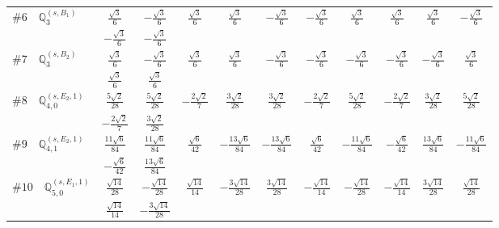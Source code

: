 \documentclass[fleqn,9pt,landscape]{jsarticle}
\begin{document}
\begin{center}
\begin{longtable}{lcccccccccc}
$ \#6\quad \mathbb{Q}_{3}^{(s,B_{1})} $ & $ \frac{\sqrt{3}}{6} $ & $ - \frac{\sqrt{3}}{6} $ & $ \frac{\sqrt{3}}{6} $ & $ \frac{\sqrt{3}}{6} $ & $ - \frac{\sqrt{3}}{6} $ & $ - \frac{\sqrt{3}}{6} $ & $ \frac{\sqrt{3}}{6} $ & $ \frac{\sqrt{3}}{6} $ & $ \frac{\sqrt{3}}{6} $ & $ - \frac{\sqrt{3}}{6} $ \\
& $ - \frac{\sqrt{3}}{6} $ & $ - \frac{\sqrt{3}}{6} $ & $  $ & $  $ & $  $ & $  $ & $  $ & $  $ & $  $ & $  $ \\ \hline
$ \#7\quad \mathbb{Q}_{3}^{(s,B_{2})} $ & $ \frac{\sqrt{3}}{6} $ & $ - \frac{\sqrt{3}}{6} $ & $ \frac{\sqrt{3}}{6} $ & $ \frac{\sqrt{3}}{6} $ & $ - \frac{\sqrt{3}}{6} $ & $ - \frac{\sqrt{3}}{6} $ & $ - \frac{\sqrt{3}}{6} $ & $ - \frac{\sqrt{3}}{6} $ & $ - \frac{\sqrt{3}}{6} $ & $ \frac{\sqrt{3}}{6} $ \\
& $ \frac{\sqrt{3}}{6} $ & $ \frac{\sqrt{3}}{6} $ & $  $ & $  $ & $  $ & $  $ & $  $ & $  $ & $  $ & $  $ \\ \hline
$ \#8\quad \mathbb{Q}_{4,0}^{(s,E_{2},1)} $ & $ \frac{5 \sqrt{2}}{28} $ & $ \frac{5 \sqrt{2}}{28} $ & $ - \frac{2 \sqrt{2}}{7} $ & $ \frac{3 \sqrt{2}}{28} $ & $ \frac{3 \sqrt{2}}{28} $ & $ - \frac{2 \sqrt{2}}{7} $ & $ \frac{5 \sqrt{2}}{28} $ & $ - \frac{2 \sqrt{2}}{7} $ & $ \frac{3 \sqrt{2}}{28} $ & $ \frac{5 \sqrt{2}}{28} $ \\
& $ - \frac{2 \sqrt{2}}{7} $ & $ \frac{3 \sqrt{2}}{28} $ & $  $ & $  $ & $  $ & $  $ & $  $ & $  $ & $  $ & $  $ \\ \hline
$ \#9\quad \mathbb{Q}_{4,1}^{(s,E_{2},1)} $ & $ \frac{11 \sqrt{6}}{84} $ & $ \frac{11 \sqrt{6}}{84} $ & $ \frac{\sqrt{6}}{42} $ & $ - \frac{13 \sqrt{6}}{84} $ & $ - \frac{13 \sqrt{6}}{84} $ & $ \frac{\sqrt{6}}{42} $ & $ - \frac{11 \sqrt{6}}{84} $ & $ - \frac{\sqrt{6}}{42} $ & $ \frac{13 \sqrt{6}}{84} $ & $ - \frac{11 \sqrt{6}}{84} $ \\
& $ - \frac{\sqrt{6}}{42} $ & $ \frac{13 \sqrt{6}}{84} $ & $  $ & $  $ & $  $ & $  $ & $  $ & $  $ & $  $ & $  $ \\ \hline
$ \#10\quad \mathbb{Q}_{5,0}^{(s,E_{1},1)} $ & $ \frac{\sqrt{14}}{28} $ & $ - \frac{\sqrt{14}}{28} $ & $ \frac{\sqrt{14}}{14} $ & $ - \frac{3 \sqrt{14}}{28} $ & $ \frac{3 \sqrt{14}}{28} $ & $ - \frac{\sqrt{14}}{14} $ & $ - \frac{\sqrt{14}}{28} $ & $ - \frac{\sqrt{14}}{14} $ & $ \frac{3 \sqrt{14}}{28} $ & $ \frac{\sqrt{14}}{28} $ \\
& $ \frac{\sqrt{14}}{14} $ & $ - \frac{3 \sqrt{14}}{28} $ & $  $ & $  $ & $  $ & $  $ & $  $ & $  $ & $  $ & $  $ \\ \hline

\end{longtable}
\end{center}
\end{document}
